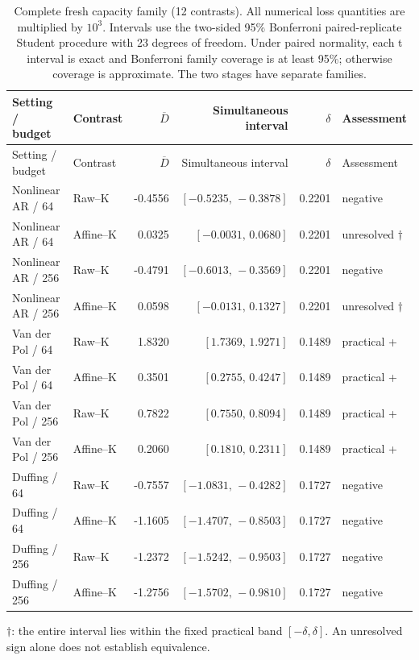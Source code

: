 \begingroup\small\setlength{\tabcolsep}{3pt}
\begin{longtable}{llrrrl}
\caption{Complete fresh capacity family (12 contrasts). All numerical loss quantities are multiplied by $10^3$. Intervals use the two-sided 95\% Bonferroni paired-replicate Student procedure with 23 degrees of freedom. Under paired normality, each t interval is exact and Bonferroni family coverage is at least 95\%; otherwise coverage is approximate. The two stages have separate families.}\label{tab:all-capacity}\\
\toprule
Setting / budget & Contrast & $\overline D$ & Simultaneous interval & $\delta$ & Assessment \\
\midrule
\endfirsthead
\toprule
Setting / budget & Contrast & $\overline D$ & Simultaneous interval & $\delta$ & Assessment \\
\midrule
\endhead
\bottomrule\endfoot
Nonlinear AR / 64 & Raw--K & -0.4556 & $[-0.5235,\,-0.3878]$ & 0.2201 & negative \\
Nonlinear AR / 64 & Affine--K & 0.0325 & $[-0.0031,\,0.0680]$ & 0.2201 & unresolved $\dagger$ \\
Nonlinear AR / 256 & Raw--K & -0.4791 & $[-0.6013,\,-0.3569]$ & 0.2201 & negative \\
Nonlinear AR / 256 & Affine--K & 0.0598 & $[-0.0131,\,0.1327]$ & 0.2201 & unresolved $\dagger$ \\
Van der Pol / 64 & Raw--K & 1.8320 & $[1.7369,\,1.9271]$ & 0.1489 & practical + \\
Van der Pol / 64 & Affine--K & 0.3501 & $[0.2755,\,0.4247]$ & 0.1489 & practical + \\
Van der Pol / 256 & Raw--K & 0.7822 & $[0.7550,\,0.8094]$ & 0.1489 & practical + \\
Van der Pol / 256 & Affine--K & 0.2060 & $[0.1810,\,0.2311]$ & 0.1489 & practical + \\
Duffing / 64 & Raw--K & -0.7557 & $[-1.0831,\,-0.4282]$ & 0.1727 & negative \\
Duffing / 64 & Affine--K & -1.1605 & $[-1.4707,\,-0.8503]$ & 0.1727 & negative \\
Duffing / 256 & Raw--K & -1.2372 & $[-1.5242,\,-0.9503]$ & 0.1727 & negative \\
Duffing / 256 & Affine--K & -1.2756 & $[-1.5702,\,-0.9810]$ & 0.1727 & negative \\
\end{longtable}
\noindent $\dagger$: the entire interval lies within the fixed practical band $[-\delta,\delta]$. An unresolved sign alone does not establish equivalence.
\endgroup

